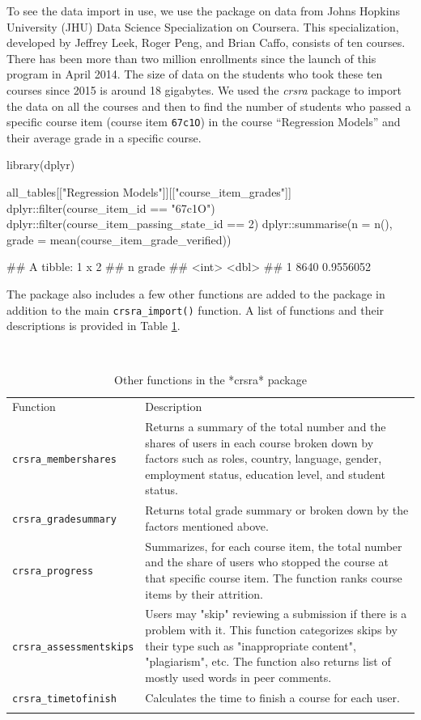 To see the data import in use, we use the package on data from Johns
Hopkins University (JHU) Data Science Specialization on Coursera. This
specialization, developed by Jeffrey Leek, Roger Peng, and Brian Caffo,
consists of ten courses. There has been more than two million
enrollments since the launch of this program in April 2014. The size of
data on the students who took these ten courses since 2015 is around 18
gigabytes. We used the \emph{crsra} package to import the data on all
the courses and then to find the number of students who passed a
specific course item (course item \texttt{67c1O}) in the course
``Regression Models'' and their average grade in a specific course.

\begin{Schunk}
\begin{Sinput}
library(dplyr)

all_tables[["Regression Models"]][["course_item_grades"]] %
    dplyr::filter(course_item_id == "67c1O") %
    dplyr::filter(course_item_passing_state_id == 2) %
    dplyr::summarise(n = n(), grade = mean(course_item_grade_verified))

## A tibble: 1 x 2
##      n     grade
##   <int>    <dbl>
## 1  8640 0.9556052
\end{Sinput}
\end{Schunk}

The package also includes a few other functions are added to the package
in addition to the main \texttt{crsra\_import()} function. A list of
functions and their descriptions is provided in Table
\ref{tab:functions}.

\begin{table}
\footnotesize
\caption{Other functions in the *crsra* package}\
\centering
\label{tab:functions}
\begin{tabular}{p{3cm}|p{7cm}}
Function & Description \\
\addlinespace
\toprule
\texttt{crsra\_membershares} & Returns a summary of the total number and the shares of users in each course broken down by factors such as roles, country, language, gender, employment status, education level, and student status.\\
\midrule
\texttt{crsra\_gradesummary} & Returns total grade summary or broken down by the factors mentioned above.\\
\midrule
\texttt{crsra\_progress} & Summarizes, for each course item, the total number and the share of users who stopped the course at that specific course item. The function ranks course items by their attrition.\\
\midrule
\texttt{crsra\_assessmentskips} & Users may "skip" reviewing a submission if there is a problem with it. This function categorizes skips by their type such as "inappropriate content", "plagiarism", etc. The function also returns list of mostly used words in peer comments.\\
\midrule
\texttt{crsra\_timetofinish} & Calculates the time to finish a course for each user.\\
\addlinespace
\bottomrule
\end{tabular}
\end{table}

